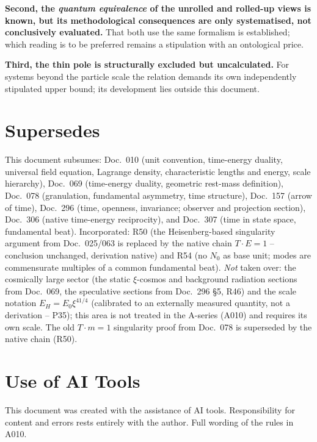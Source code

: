 \textbf{Second, the \emph{quantum equivalence} of the unrolled and rolled-up
views is known, but its methodological consequences are only systematised, not
conclusively evaluated.} That both use the same formalism is established; which
reading is to be preferred remains a stipulation with an ontological price.

\textbf{Third, the thin pole is structurally excluded but uncalculated.} For
systems beyond the particle scale the relation demands its own independently
stipulated upper bound; its development lies outside this document.

\section{Supersedes}

This document subsumes: Doc.~010 (unit convention, time-energy duality,
universal field equation, Lagrange density, characteristic lengths and energy,
scale hierarchy), Doc.~069 (time-energy duality, geometric rest-mass definition),
Doc.~078 (granulation, fundamental asymmetry, time structure), Doc.~157 (arrow
of time), Doc.~296 (time, openness, invariance; observer and projection section),
Doc.~306 (native time-energy reciprocity), and Doc.~307 (time in state space,
fundamental beat). Incorporated: R50 (the Heisenberg-based singularity argument
from Doc.~025/063 is replaced by the native chain $T\cdot E=1$ -- conclusion
unchanged, derivation native) and R54 (no $N_0$ as base unit; modes are
commensurate multiples of a common fundamental beat). \emph{Not} taken over: the
cosmically large sector (the static $\xi$-cosmos and background radiation sections
from Doc.~069, the speculative sections from Doc.~296 §5, R46) and the scale
notation $E_H=E_0\xi^{41/4}$ (calibrated to an externally measured quantity, not
a derivation -- P35); this area is not treated in the A-series (A010) and requires
its own scale. The old $T\cdot m=1$ singularity proof from Doc.~078 is superseded
by the native chain (R50).

\section{Use of AI Tools}

This document was created with the assistance of AI tools.
Responsibility for content and errors rests entirely with the author.
Full wording of the rules in A010.
